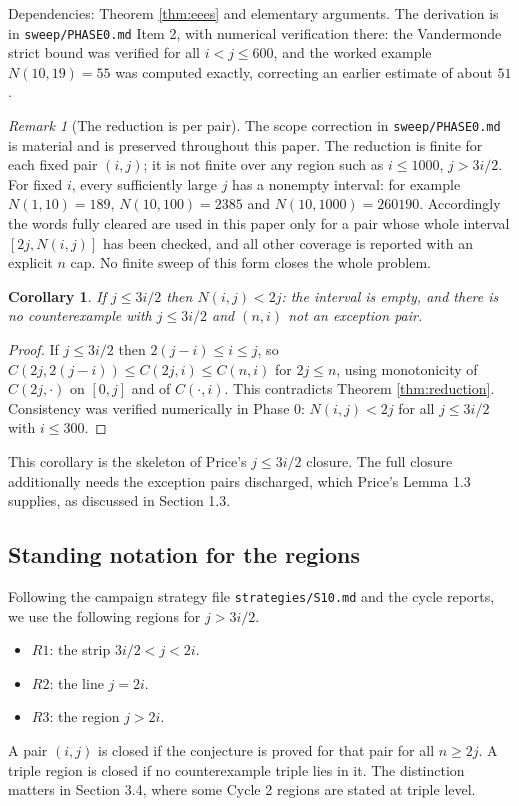 \documentclass[11pt]{article}
\newtheorem{corollary}[theorem]{Corollary}
\theoremstyle{remark}
\newtheorem{remark}[theorem]{Remark}
\begin{document}
Dependencies: Theorem \ref{thm:eees} and elementary arguments. The derivation is in \texttt{sweep/PHASE0.md} Item 2, with numerical verification there: the Vandermonde strict bound was verified for all $i<j\le 600$, and the worked example $N(10,19)=55$ was computed exactly, correcting an earlier estimate of about $51$.

\begin{remark}[The reduction is per pair]
The scope correction in \texttt{sweep/PHASE0.md} is material and is preserved throughout this paper. The reduction is finite for each fixed pair $(i,j)$; it is not finite over any region such as $i\le 1000$, $j>3i/2$. For fixed $i$, every sufficiently large $j$ has a nonempty interval: for example $N(1,10)=189$, $N(10,100)=2385$ and $N(10,1000)=260190$. Accordingly the words fully cleared are used in this paper only for a pair whose whole interval $[2j,N(i,j)]$ has been checked, and all other coverage is reported with an explicit $n$ cap. No finite sweep of this form closes the whole problem.
\end{remark}

\begin{corollary}
If $j\le 3i/2$ then $N(i,j)<2j$: the interval is empty, and there is no counterexample with $j\le 3i/2$ and $(n,i)$ not an exception pair.
\end{corollary}

\begin{proof}
If $j\le 3i/2$ then $2(j-i)\le i\le j$, so $C(2j,2(j-i))\le C(2j,i)\le C(n,i)$ for $2j\le n$, using monotonicity of $C(2j,\cdot)$ on $[0,j]$ and of $C(\cdot,i)$. This contradicts Theorem \ref{thm:reduction}. Consistency was verified numerically in Phase 0: $N(i,j)<2j$ for all $j\le 3i/2$ with $i\le 300$.
\end{proof}

This corollary is the skeleton of Price's $j\le 3i/2$ closure. The full closure additionally needs the exception pairs discharged, which Price's Lemma 1.3 supplies, as discussed in Section 1.3.

\subsection{Standing notation for the regions}

Following the campaign strategy file \texttt{strategies/S10.md} and the cycle reports, we use the following regions for $j>3i/2$.
\begin{itemize}[leftmargin=2em]
\item $R1$: the strip $3i/2<j<2i$.
\item $R2$: the line $j=2i$.
\item $R3$: the region $j>2i$.
\end{itemize}
A pair $(i,j)$ is closed if the conjecture is proved for that pair for all $n\ge 2j$. A triple region is closed if no counterexample triple lies in it. The distinction matters in Section 3.4, where some Cycle 2 regions are stated at triple level.
\end{document}
